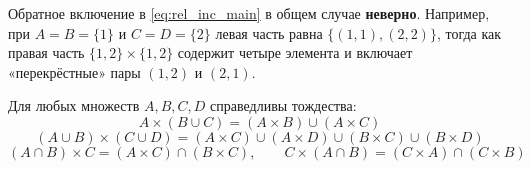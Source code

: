\begin{remark}
    Обратное включение в \eqref{eq:rel_inc_main} в общем случае 
    \textbf{неверно}. Например, при $A = B = \{1\}$ и $C = D = \{2\}$ 
    левая часть равна $\{(1, 1), (2, 2)\}$, тогда как правая часть 
    $\{1, 2\} \times \{1, 2\}$ содержит четыре элемента и включает 
    «перекрёстные» пары $(1, 2)$ и $(2, 1)$.
\end{remark}

\begin{lemma}
    Для любых множеств $A, B, C, D$ справедливы тождества:
    \begin{equation} \label{eq:cart_distrib_cup}
        A \times (B \cup C) = (A \times B) \cup (A \times C) \tag{4}
    \end{equation}
    \begin{equation} \label{eq:cart_distrib_4}
        (A \cup B) \times (C \cup D) = 
        (A \times C) \cup (A \times D) \cup (B \times C) \cup (B \times D) 
        \tag{5}
    \end{equation}
    \begin{equation} \label{eq:cart_distrib_cap}
        (A \cap B) \times C = (A \times C) \cap (B \times C), \qquad
        C \times (A \cap B) = (C \times A) \cap (C \times B) \tag{6}
    \end{equation}
\end{lemma}


